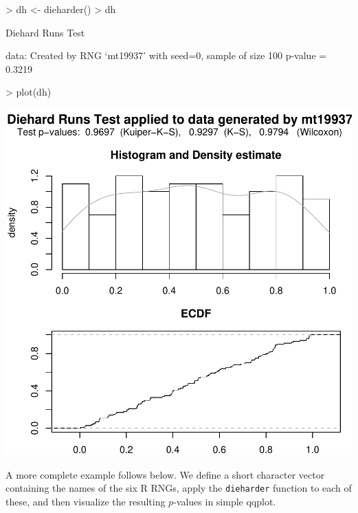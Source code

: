 \documentclass[12pt]{article}
\begin{document}
\begin{center}
\begin{footnotesize}
%
\begin{Schunk}
\begin{Sinput}
> dh <- dieharder()
> dh
\end{Sinput}
\begin{Soutput}
	Diehard Runs Test

data:  Created by RNG `mt19937' with seed=0, sample of size 100 
p-value = 0.3219
\end{Soutput}
\begin{Sinput}
> plot(dh)
\end{Sinput}
\end{Schunk}
\includegraphics{RDieHarder-rd-example}
% 
\end{footnotesize}
\end{center}

A more complete example follows below.  We define a short character vector
containing the names of the six R RNGs, apply the \texttt{dieharder} function to
each of these, and then visualize the resulting $p$-values in simple qqplot.
\end{document}
